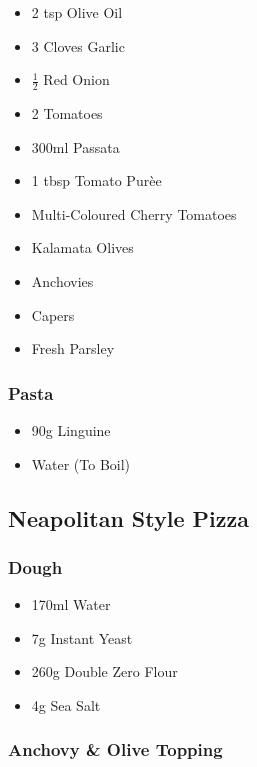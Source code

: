 \documentclass[11pt, english]{article}
\begin{document}
	\begin{itemize}
	\setlength\itemsep{0cm}
		\item 2 tsp Olive Oil
		\item 3 Cloves Garlic
		\item $\frac{1}{2}$ Red Onion
		\item 2 Tomatoes
		\item 300ml Passata
		\item 1 tbsp Tomato Pur\`{e}e
		\item Multi-Coloured Cherry Tomatoes
		\item Kalamata Olives
		\item Anchovies
		\item Capers
		\item Fresh Parsley

	\end{itemize}

		\subsubsection*{Pasta}

        \begin{itemize}
        \setlength\itemsep{0cm}
                \item 90g Linguine 
                \item Water (To Boil)
        \end{itemize}

\newpage

	\subsection{Neapolitan Style Pizza}

		\subsubsection*{Dough}

	\begin{itemize}
        \setlength\itemsep{0cm}
                \item 170ml Water
		\item 7g Instant Yeast
		\item 260g Double Zero Flour
		\item 4g Sea Salt
        \end{itemize}

		\subsubsection*{Anchovy \& Olive Topping}
\end{document}
